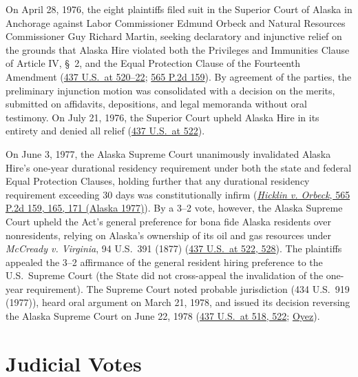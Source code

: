 \documentclass[12pt]{article}
\begin{document}
On April 28, 1976, the eight plaintiffs filed suit in the Superior Court of Alaska in Anchorage against Labor Commissioner Edmund Orbeck and Natural Resources Commissioner Guy Richard Martin, seeking declaratory and injunctive relief on the grounds that Alaska Hire violated both the Privileges and Immunities Clause of Article IV, \S\ 2, and the Equal Protection Clause of the Fourteenth Amendment (\href{https://supreme.justia.com/cases/federal/us/437/518/}{437 U.S.\ at 520--22}; \href{https://law.justia.com/cases/alaska/supreme-court/1977/3025-1.html}{565 P.2d 159}). By agreement of the parties, the preliminary injunction motion was consolidated with a decision on the merits, submitted on affidavits, depositions, and legal memoranda without oral testimony. On July 21, 1976, the Superior Court upheld Alaska Hire in its entirety and denied all relief (\href{https://supreme.justia.com/cases/federal/us/437/518/}{437 U.S.\ at 522}).

On June 3, 1977, the Alaska Supreme Court unanimously invalidated Alaska Hire's one-year durational residency requirement under both the state and federal Equal Protection Clauses, holding further that any durational residency requirement exceeding 30 days was constitutionally infirm (\href{https://law.justia.com/cases/alaska/supreme-court/1977/3025-1.html}{\textit{Hicklin v. Orbeck}, 565 P.2d 159, 165, 171 (Alaska 1977)}). By a 3--2 vote, however, the Alaska Supreme Court upheld the Act's general preference for bona fide Alaska residents over nonresidents, relying on Alaska's ownership of its oil and gas resources under \textit{McCready v. Virginia}, 94 U.S.\ 391 (1877) (\href{https://supreme.justia.com/cases/federal/us/437/518/}{437 U.S.\ at 522, 528}). The plaintiffs appealed the 3--2 affirmance of the general resident hiring preference to the U.S.\ Supreme Court (the State did not cross-appeal the invalidation of the one-year requirement). The Supreme Court noted probable jurisdiction (434 U.S.\ 919 (1977)), heard oral argument on March 21, 1978, and issued its decision reversing the Alaska Supreme Court on June 22, 1978 (\href{https://supreme.justia.com/cases/federal/us/437/518/}{437 U.S.\ at 518, 522}; \href{https://www.oyez.org/cases/1977/77-324}{Oyez}).

\section{Judicial Votes}
\end{document}
